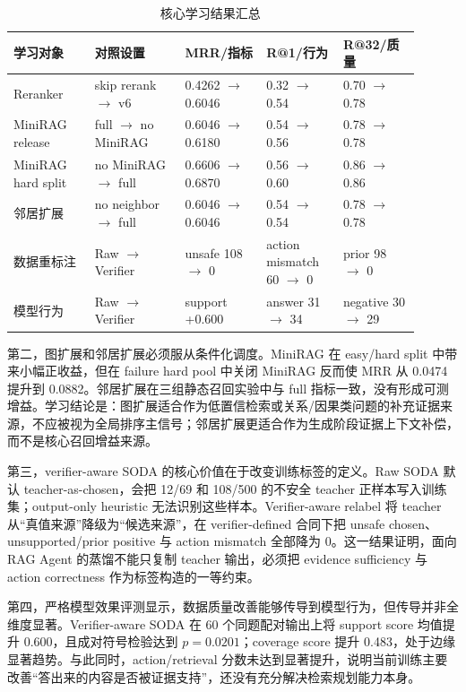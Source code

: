 \documentclass[UTF8,a4paper,12pt]{ctexart}
\begin{document}
\begin{table}[htbp]
\centering
\small
\begin{tabular}{p{0.18\linewidth}p{0.20\linewidth}p{0.18\linewidth}p{0.17\linewidth}p{0.17\linewidth}}
\toprule
学习对象 & 对照设置 & MRR/指标 & R@1/行为 & R@32/质量 \\
\midrule
Reranker & skip rerank $\rightarrow$ v6 & 0.4262 $\rightarrow$ 0.6046 & 0.32 $\rightarrow$ 0.54 & 0.70 $\rightarrow$ 0.78 \\
MiniRAG release & full $\rightarrow$ no MiniRAG & 0.6046 $\rightarrow$ 0.6180 & 0.54 $\rightarrow$ 0.56 & 0.78 $\rightarrow$ 0.78 \\
MiniRAG hard split & no MiniRAG $\rightarrow$ full & 0.6606 $\rightarrow$ 0.6870 & 0.56 $\rightarrow$ 0.60 & 0.86 $\rightarrow$ 0.86 \\
邻居扩展 & no neighbor $\rightarrow$ full & 0.6046 $\rightarrow$ 0.6046 & 0.54 $\rightarrow$ 0.54 & 0.78 $\rightarrow$ 0.78 \\
数据重标注 & Raw $\rightarrow$ Verifier & unsafe 108 $\rightarrow$ 0 & action mismatch 60 $\rightarrow$ 0 & prior 98 $\rightarrow$ 0 \\
模型行为 & Raw $\rightarrow$ Verifier & support +0.600 & answer 31 $\rightarrow$ 34 & negative 30 $\rightarrow$ 29 \\
\bottomrule
\end{tabular}
\caption{核心学习结果汇总}
\end{table}

第二，图扩展和邻居扩展必须服从条件化调度。MiniRAG 在 easy/hard split 中带来小幅正收益，但在 failure hard pool 中关闭 MiniRAG 反而使 MRR 从 0.0474 提升到 0.0882。邻居扩展在三组静态召回实验中与 full 指标一致，没有形成可测增益。学习结论是：图扩展适合作为低置信检索或关系/因果类问题的补充证据来源，不应被视为全局排序主信号；邻居扩展更适合作为生成阶段证据上下文补偿，而不是核心召回增益来源。

第三，verifier-aware SODA 的核心价值在于改变训练标签的定义。Raw SODA 默认 teacher-as-chosen，会把 12/69 和 108/500 的不安全 teacher 正样本写入训练集；output-only heuristic 无法识别这些样本。Verifier-aware relabel 将 teacher 从“真值来源”降级为“候选来源”，在 verifier-defined 合同下把 unsafe chosen、unsupported/prior positive 与 action mismatch 全部降为 0。这一结果证明，面向 RAG Agent 的蒸馏不能只复制 teacher 输出，必须把 evidence sufficiency 与 action correctness 作为标签构造的一等约束。

第四，严格模型效果评测显示，数据质量改善能够传导到模型行为，但传导并非全维度显著。Verifier-aware SODA 在 60 个同题配对输出上将 support score 均值提升 0.600，且成对符号检验达到 $p=0.0201$；coverage score 提升 0.483，处于边缘显著趋势。与此同时，action/retrieval 分数未达到显著提升，说明当前训练主要改善“答出来的内容是否被证据支持”，还没有充分解决检索规划能力本身。
\end{document}
